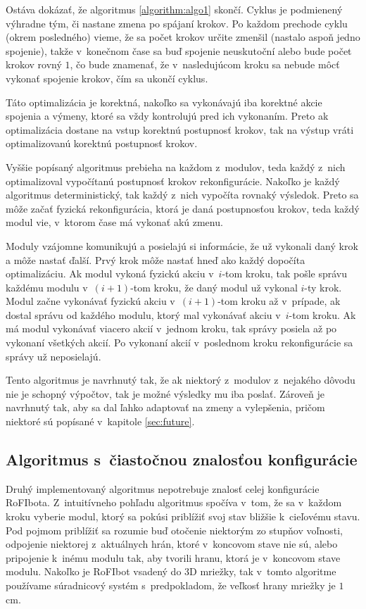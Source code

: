 \documentclass[
  printed, %
  oneside, %
  notable,   %
  nolof,     %
  nolot,     %
]{fithesis3}
\begin{document}
Ostáva dokázať, že algoritmus \ref{algorithm:algo1} skončí. Cyklus je podmienený výhradne tým, či nastane zmena po spájaní krokov. Po každom prechode cyklu (okrem posledného) vieme, že sa počet krokov určite zmenšil (nastalo aspoň jedno spojenie), takže v~konečnom čase sa buď spojenie neuskutoční alebo bude počet krokov rovný $1$, čo bude znamenať, že v~nasledujúcom kroku sa nebude môcť vykonať spojenie krokov, čím sa ukončí cyklus. 

Táto optimalizácia je korektná, nakoľko sa vykonávajú iba korektné akcie spojenia a výmeny, ktoré sa vždy kontrolujú pred ich vykonaním. Preto ak optimalizácia dostane na vstup korektnú postupnosť krokov, tak na výstup vráti optimalizovanú korektnú postupnosť krokov. 

Vyššie popísaný algoritmus prebieha na každom z~modulov, teda každý z~nich optimalizoval vypočítanú postupnosť krokov rekonfigurácie. Nakoľko je každý algoritmus deterministický, tak každý z~nich vypočíta rovnaký výsledok. Preto sa môže začať fyzická rekonfigurácia, ktorá je daná postupnosťou krokov, teda každý modul vie, v~ktorom čase má vykonať akú zmenu. 

Moduly vzájomne komunikujú a posielajú si informácie, že už vykonali daný krok a môže nastať ďalší. Prvý krok môže nastať hneď ako každý dopočíta optimalizáciu. Ak modul vykoná fyzickú akciu v~$i$-tom kroku, tak pošle správu každému modulu v~$(i + 1)$-tom kroku, že daný modul už vykonal $i$-ty krok. Modul začne vykonávať fyzickú akciu v~$(i + 1)$-tom kroku až v~prípade, ak dostal správu od každého modulu, ktorý mal vykonávať akciu v~$i$-tom kroku. Ak má modul vykonávať viacero akcií v~jednom kroku, tak správy posiela až po vykonaní všetkých akcií. Po vykonaní akcií v~poslednom kroku rekonfigurácie sa správy už neposielajú. 

Tento algoritmus je navrhnutý tak, že ak niektorý z~modulov z~nejakého dôvodu nie je schopný výpočtov, tak je možné výsledky mu iba poslať. Zároveň je navrhnutý tak, aby sa dal ľahko adaptovať na zmeny a vylepšenia, pričom niektoré sú popísané v~kapitole \ref{sec:future}.  

\subsection{Algoritmus s~čiastočnou znalosťou konfigurácie}
\label{sec:distributedAlgo}
Druhý implementovaný algoritmus nepotrebuje znalosť celej konfigurácie RoFIbota. Z~intuitívneho pohľadu algoritmus spočíva v~tom, že sa v~každom kroku vyberie modul, ktorý sa pokúsi priblížiť svoj stav bližšie k~cieľovému stavu. Pod pojmom priblížiť sa rozumie buď otočenie niektorým zo stupňov voľnosti, odpojenie niektorej z~aktuálnych hrán, ktoré v~koncovom stave nie sú, alebo pripojenie k~inému modulu tak, aby tvorili hranu, ktorá je v~koncovom stave modulu. Nakoľko je RoFIbot vsadený do 3D mriežky, tak v~tomto algoritme používame súradnicový systém s~predpokladom, že veľkosť hrany mriežky je $1$\,cm. 
\end{document}

